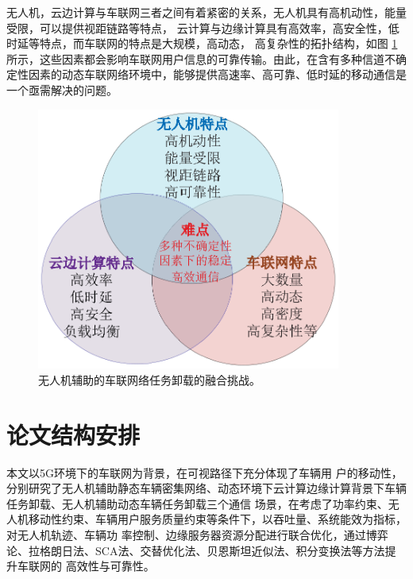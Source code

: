\textcolor[RGB]{202,12,22}{无人机，云边计算与车联网三者之间有着紧密的关系，无人机具有高机动性，能量受限，可以提供视距链路等特点，
云计算与边缘计算具有高效率，高安全性，低时延等特点，而车联网的特点是大规模，高动态，
高复杂性的拓扑结构，如图 \ref{5G通信与车联网融合挑战} 所示，这些因素都会影响车联网用户信息的可靠传输。由此，在含有多种信道不确定性因素的动态车联网络环境中，能够提供高速率、高可靠、低时延的移动通信是一个亟需解决的问题。}
\begin{figure}[H]
\centering
\includegraphics[width=10cm]{figures//chap1//5G通信与车联网融合挑战.eps}
\caption{无人机辅助的车联网络任务卸载的融合挑战。}
\label{5G通信与车联网融合挑战}
\end{figure}
\section{论文结构安排}\label{section1-4}
本文以5G环境下的车联网为背景，在可视路径下充分体现了车辆用
户的移动性，分别研究了无人机辅助静态车辆密集网络、动态环境下云计算边缘计算背景下车辆任务卸载、无人机辅助动态车辆任务卸载三个通信
场景，在考虑了功率约束、无人机移动性约束、车辆用户服务质量约束等条件下，以吞吐量、系统能效为指标，对无人机轨迹、车辆功
率控制、边缘服务器资源分配进行联合优化，通过博弈论、拉格朗日法、SCA法、交替优化法、贝恩斯坦近似法、积分变换法等方法提升车联网的
高效性与可靠性。

